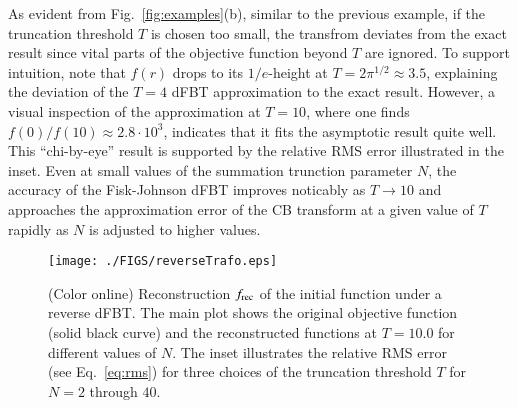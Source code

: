 \documentclass[review]{elsarticle}
\begin{document}
As evident from Fig.~\ref{fig:examples}(b), similar to the previous example, if
the truncation threshold $T$ is chosen too small, the transfrom deviates from
the exact result since vital parts of the objective function beyond $T$ are
ignored. To support intuition, note that $f(r)$ drops to its $1/e$-height at
$T=2 \pi^{1/2}\approx 3.5$, explaining the deviation of the $T=4$ dFBT
approximation to the exact result.
However, a visual inspection of the approximation at $T=10$, where one finds 
\mbox{$f(0)/f(10)\approx 2.8\cdot 10^3$}, indicates that it fits the asymptotic
result quite well. This ``chi-by-eye'' result is supported by the relative RMS
error illustrated in the inset. Even at small values of the summation trunction
parameter $N$, the accuracy of the Fisk-Johnson dFBT improves noticably as
$T\to 10$ and approaches the approximation error of the CB transform at a given
value of $T$ rapidly as $N$ is adjusted to higher values. 

%
%
\begin{figure}[t!]
\centerline{\texttt{[image: ./FIGS/reverseTrafo.eps]} } 
\caption{(Color online) Reconstruction $f_{\rm rec}$ of the initial function
under a reverse dFBT. The main plot shows the original objective function
(solid black curve) and the reconstructed functions at $T=10.0$ for different
values of $N$. The inset illustrates the relative RMS error (see
Eq.~\ref{eq:rms}) for three choices of the truncation threshold $T$ for $N=2$
through $40$.}
\label{fig:reverseTrafo}
\end{figure}
\end{document}
